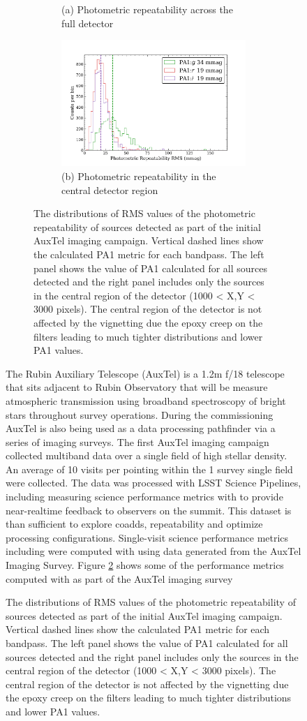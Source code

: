 \begin{figure}[!ht]
\begin{figure}[!ht]
\begin{subfigure}{.5\textwidth}
     \caption[\small]{(a) Photometric repeatability across the full detector}
\end{subfigure}%
\begin{subfigure}{.5\textwidth} 
    \centering
    \includegraphics[width=1.1\textwidth]{figures/pa1_auxtel_central}
    \caption[\small]{(b) Photometric repeatability in the central detector region}
\end{subfigure}
\par\medskip %
\caption[short]{The distributions of RMS values of the photometric repeatability of sources detected as part of the initial AuxTel imaging campaign. Vertical dashed lines show the calculated PA1 metric for each bandpass. The left panel shows the value of PA1 calculated for all sources detected and the right panel includes only the sources in the central region of the detector (1000 < X,Y < 3000 pixels). The central region of the detector is not affected by the vignetting due the epoxy creep on the filters leading to much tighter distributions and lower PA1 values.}
\label{fig:faro_auxtel_metrics}
\end{figure}


The Rubin Auxiliary Telescope\cite{10.1117/12.2561112} (AuxTel) is a 1.2m f/18 telescope that sits adjacent to Rubin Observatory that will be measure atmospheric transmission using broadband spectroscopy of bright stars throughout survey operations. 
During the commissioning AuxTel is also being used as a data processing pathfinder via a series of imaging surveys.
The first AuxTel imaging campaign collected multiband data over a single field of high stellar density.
An average of 10 visits per pointing within the 1 \degsq survey single field were collected. 
The data was processed with LSST Science Pipelines, including measuring science performance metrics with \faro to provide near-realtime feedback to observers on the summit.
This dataset is than sufficient to explore coadds, repeatability and optimize processing configurations.
Single-visit science performance metrics including  were computed with \faro using data generated from the AuxTel Imaging Survey. 
Figure \ref{fig:faro_auxtel_metrics} shows some of the performance metrics computed with \faro as part of the AuxTel imaging survey


\end{figure}

